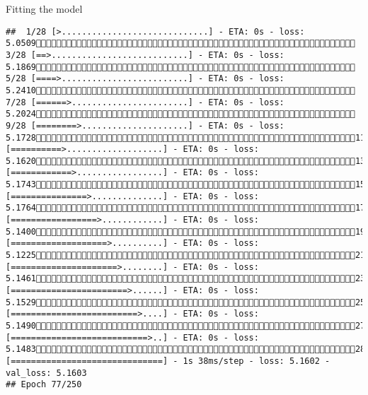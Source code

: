 \documentclass[
  ignorenonframetext,
]{beamer}
\begin{document}
\begin{frame}[fragile]{Fitting the model}
\begin{verbatim}
##  1/28 [>.............................] - ETA: 0s - loss: 5.0509 3/28 [==>...........................] - ETA: 0s - loss: 5.1869 5/28 [====>.........................] - ETA: 0s - loss: 5.2410 7/28 [======>.......................] - ETA: 0s - loss: 5.2024 9/28 [========>.....................] - ETA: 0s - loss: 5.172811/28 [==========>...................] - ETA: 0s - loss: 5.162013/28 [============>.................] - ETA: 0s - loss: 5.174315/28 [===============>..............] - ETA: 0s - loss: 5.176417/28 [=================>............] - ETA: 0s - loss: 5.140019/28 [===================>..........] - ETA: 0s - loss: 5.122521/28 [=====================>........] - ETA: 0s - loss: 5.146123/28 [=======================>......] - ETA: 0s - loss: 5.152925/28 [=========================>....] - ETA: 0s - loss: 5.149027/28 [===========================>..] - ETA: 0s - loss: 5.148328/28 [==============================] - 1s 38ms/step - loss: 5.1602 - val_loss: 5.1603
## Epoch 77/250

\end{verbatim}
\end{frame}
\end{document}
